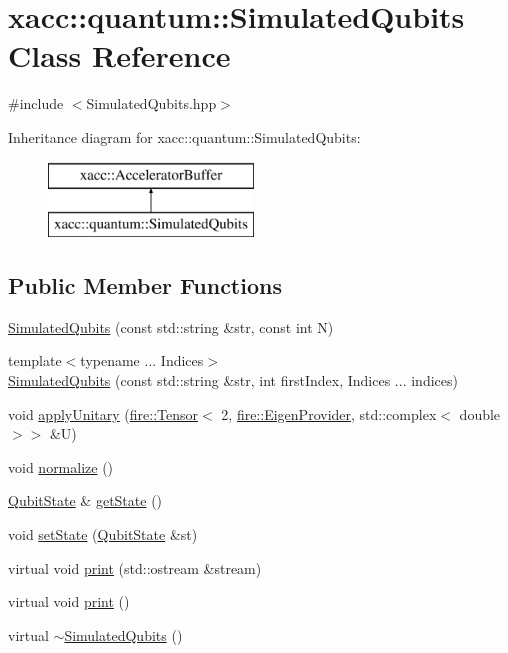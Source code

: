 \hypertarget{a01345}{}\section{xacc\+:\+:quantum\+:\+:Simulated\+Qubits Class Reference}
\label{a01345}


{\ttfamily \#include $<$Simulated\+Qubits.\+hpp$>$}

Inheritance diagram for xacc\+:\+:quantum\+:\+:Simulated\+Qubits\+:\begin{figure}[H]
\begin{center}
\leavevmode
\includegraphics[height=2.000000cm]{a01345}
\end{center}
\end{figure}
\subsection*{Public Member Functions}
\begin{DoxyCompactItemize}
\item 
\hyperlink{a01345_abb0419229628210a1c187b76be6edc30}{Simulated\+Qubits} (const std\+::string \&str, const int N)
\item 
{\footnotesize template$<$typename ... Indices$>$ }\\\hyperlink{a01345_a812afe5bad306acfe2b46e05098040a4}{Simulated\+Qubits} (const std\+::string \&str, int first\+Index, Indices ... indices)
\item 
void \hyperlink{a01345_a3f4518d0135101141bf92d7e31f4fddc}{apply\+Unitary} (\hyperlink{a01445}{fire\+::\+Tensor}$<$ 2, \hyperlink{a01441}{fire\+::\+Eigen\+Provider}, std\+::complex$<$ double $>$$>$ \&U)
\item 
void \hyperlink{a01345_a09ee499769bb1eedaf08d6b5c29f9791}{normalize} ()
\item 
\hyperlink{a01445}{Qubit\+State} \& \hyperlink{a01345_a405577717ca200ed9e524c04209e0216}{get\+State} ()
\item 
void \hyperlink{a01345_a8cd74c239c1fcecb3d03d6989732d5fe}{set\+State} (\hyperlink{a01445}{Qubit\+State} \&st)
\item 
virtual void \hyperlink{a01345_a9252d30be0563f36bf1ff839c7104cd7}{print} (std\+::ostream \&stream)
\item 
virtual void \hyperlink{a01345_a32922bd2ccc64bba601c07a3c136cc3d}{print} ()
\item 
virtual \hyperlink{a01345_aebf6f30a6d8c84971091d87908680e7e}{$\sim$\+Simulated\+Qubits} ()
\end{DoxyCompactItemize}

